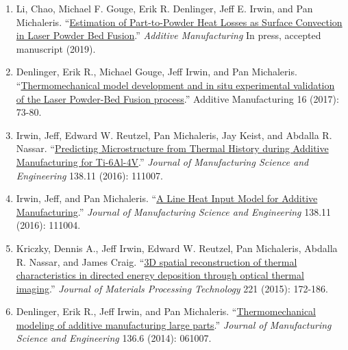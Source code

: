 \documentclass[10.5pt,letterpaper]{article}
\begin{document}
\spacedhrule{0.5em}{-0.5em}
\begin{enumerate}[leftmargin=*]
	\setlength{\parskip}{0em}
	\item Li, Chao, Michael F. Gouge, Erik R. Denlinger, Jeff E. Irwin, and Pan Michaleris. ``\href{https://www.sciencedirect.com/science/article/pii/S2214860418306535}{Estimation of Part-to-Powder Heat Losses as Surface Convection in Laser Powder Bed Fusion}.'' \emph{Additive Manufacturing} In press, accepted manuscript (2019).
	\item Denlinger, Erik R., Michael Gouge, Jeff Irwin, and Pan Michaleris. ``\href{https://www.sciencedirect.com/science/article/pii/S2214860417300441}{Thermomechanical model development and in situ experimental validation of the Laser Powder-Bed Fusion process}.'' Additive Manufacturing 16 (2017): 73-80.
	\item Irwin, Jeff, Edward W. Reutzel, Pan Michaleris, Jay Keist, and Abdalla R. Nassar. ``\href{http://manufacturingscience.asmedigitalcollection.asme.org/article.aspx?articleid=2520839}{Predicting Microstructure from Thermal History during Additive Manufacturing for Ti-6Al-4V}.'' \emph{Journal of Manufacturing Science and Engineering} 138.11 (2016): 111007.
	\item Irwin, Jeff, and Pan Michaleris. ``\href{http://manufacturingscience.asmedigitalcollection.asme.org/article.aspx?articleid=2525324}{A Line Heat Input Model for Additive Manufacturing}.'' \emph{Journal of Manufacturing Science and Engineering} 138.11 (2016): 111004.
	\item Kriczky, Dennis A., Jeff Irwin, Edward W. Reutzel, Pan Michaleris, Abdalla R. Nassar, and James Craig. ``\href{https://www.sciencedirect.com/science/article/pii/S0924013615000643}{3D spatial reconstruction of thermal characteristics in directed energy deposition through optical thermal imaging}.'' \emph{Journal of Materials Processing Technology} 221 (2015): 172-186.
	\item Denlinger, Erik R., Jeff Irwin, and Pan Michaleris. ``\href{http://manufacturingscience.asmedigitalcollection.asme.org/article.aspx?articleid=1910535}{Thermomechanical modeling of additive manufacturing large parts}.'' \emph{Journal of Manufacturing Science and Engineering} 136.6 (2014): 061007.
\end{enumerate}
\end{document}
